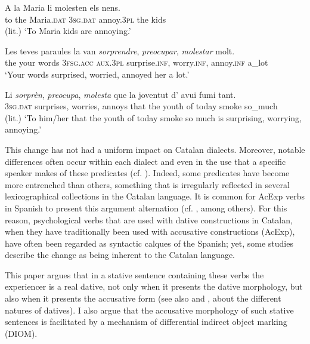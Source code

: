 \documentclass[output=paper,colorlinks,citecolor=brown,modfonts,nonflat]{langsci/langscibook}
\begin{document}
 \ex \label{ex:royo:1b}
 \gll A la Maria li molesten els nens.\\
 to the Maria.\textsc{dat} \textsc{3sg.dat} annoy.\textsc{3pl} the kids\\
 \glt  (lit.) ‘To Maria kids are annoying.’
 \z
 \z

\ea%
 \label{ex:royo:2} \citealt[77]{CabréMateu1998}
 \ea \label{ex:royo:2a}
 \gll Les teves paraules la van \emph{sorprendre}, \emph{preocupar}, \emph{molestar} molt.\\
the  your words     \textsc{3fsg.acc} \textsc{aux.3pl} surprise.\textsc{inf}, worry.\textsc{inf},  annoy.\textsc{inf} a\_lot\\
 \glt ‘Your words surprised, worried, annoyed her a lot.’

 \ex \label{ex:royo:2b}
 \gll Li \emph{sorprèn}, \emph{preocupa}, \emph{molesta} que la joventut d’ avui fumi tant.\\
\textsc{3sg.dat} surprises, worries,     annoys  that the youth     of today smoke so\_much\\
 \glt	(lit.) ‘To him/her that the youth of today smoke so much is surprising, worrying, annoying.’

 \z
 \z


This change has not had a uniform impact on Catalan dialects. Moreover, notable differences often occur within each dialect and even in the use that a specific speaker makes of these predicates (cf. \citealt[70]{CabréMateu1998}). Indeed, some predicates have become more entrenched than others, something that is irregularly reflected in several lexicographical collections in the Catalan language. It is common for AcExp verbs in Spanish to present this argument alternation (cf. \citealt{MendivilGiro2005, MarínMcNally2011}, among others). For this reason, psychological verbs that are used with dative constructions in Catalan, when they have traditionally been used with accusative constructions (AcExp), have often been regarded as syntactic calques of the Spanish; yet, some studies describe the change as being inherent to the Catalan language.

This paper argues that in a stative sentence containing these verbs the experiencer is a real dative, not only when it presents the dative morphology, but also when it presents the accusative form (see also  and , about the different natures of datives). I also argue that the accusative morphology of such stative sentences is facilitated by a mechanism of differential indirect object marking (DIOM).
\end{document}
